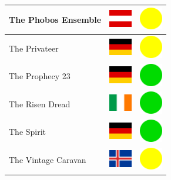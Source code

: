 \documentclass[12pt, a4paper, twoside]{report}
\begin{document}
\begin{center}
\begin{longtable}{|p{5cm}|p{2cm}|p{2cm}|}
The Phobos Ensemble & \includegraphics[width=1cm]{4x3/at} & \includegraphics[width=1cm]{likes/m} \\ \hline
The Privateer & \includegraphics[width=1cm]{4x3/de} & \includegraphics[width=1cm]{likes/m} \\ \hline
The Prophecy 23 & \includegraphics[width=1cm]{4x3/de} & \includegraphics[width=1cm]{likes/y} \\ \hline
The Risen Dread & \includegraphics[width=1cm]{4x3/ie} & \includegraphics[width=1cm]{likes/y} \\ \hline
The Spirit & \includegraphics[width=1cm]{4x3/de} & \includegraphics[width=1cm]{likes/y} \\ \hline
The Vintage Caravan & \includegraphics[width=1cm]{4x3/is} & \includegraphics[width=1cm]{likes/m} \\ \hline

\end{longtable}
\end{center}
\end{document}
